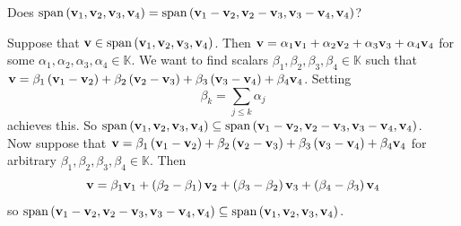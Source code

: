 \begin{exercise}
    Does \( \mathrm{span} \left( \vb{v}_{1}, \vb{v}_{2}, \vb{v}_{3}, \vb{v}_{4} \right) = \mathrm{span} \left( \vb{v}_{1} - \vb{v}_{2}, \vb{v}_{2}- \vb{v}_{3}, \vb{v}_{3}- \vb{v}_{4}, \vb{v}_{4} \right) \)?
\end{exercise}
\begin{solution}
    Suppose that \( \vb{v} \in \mathrm{span} \left( \vb{v}_{1}, \vb{v}_{2}, \vb{v}_{3}, \vb{v}_{4} \right) \). Then \( \vb{v}= \alpha_{1} \vb{v}_{1} + \alpha_{2} \vb{v}_{2} + \alpha_{3} \vb{v}_{3} + \alpha_{4} \vb{v}_{4} \) for some \( \alpha_{1}, \alpha_{2}, \alpha_{3}, \alpha_{4} \in \mathbb{K} \). We want to find scalars \( \beta_{1} , \beta_{2}, \beta_{3}, \beta_{4} \in \mathbb{K}\) such that \( \vb{v} = \beta_{1} \left( \vb{v}_{1} - \vb{v}_{2} \right) + \beta_{2} \left( \vb{v}_{2} - \vb{v}_{3} \right) + \beta_{3} \left( \vb{v}_{3} - \vb{v}_{4} \right) + \beta_{4} \vb{v}_{4}\). Setting 
    \[ \beta_{k} = \sum_{j \le k} \alpha_{j} \]
    achieves this. So \( \mathrm{span} \left( \vb{v}_{1}, \vb{v}_{2}, \vb{v}_{3}, \vb{v}_{4} \right) \subseteq \mathrm{span} \left( \vb{v}_{1} - \vb{v}_{2}, \vb{v}_{2}- \vb{v}_{3}, \vb{v}_{3}- \vb{v}_{4}, \vb{v}_{4} \right)  \). \\ 
    Now suppose that \( \vb{v} = \beta_{1} \left( \vb{v}_{1} - \vb{v}_{2} \right) + \beta_{2} \left( \vb{v}_{2} - \vb{v}_{3} \right) + \beta_{3} \left( \vb{v}_{3} - \vb{v}_{4} \right) + \beta_{4} \vb{v}_{4} \) for arbitrary \( \beta_{1} , \beta_{2}, \beta_{3}, \beta_{4} \in \mathbb{K}\). Then 
    \[ \vb{v} = \beta_{1} \vb{v}_{1} + \left( \beta_{2} - \beta_{1}\right) \vb{v}_{2} + \left( \beta_{3} - \beta_{2} \right) \vb{v}_{3} + \left( \beta_{4} - \beta_{3} \right)\vb{v}_{4}\]
    so \( \mathrm{span} \left( \vb{v}_{1} - \vb{v}_{2}, \vb{v}_{2}- \vb{v}_{3}, \vb{v}_{3}- \vb{v}_{4}, \vb{v}_{4} \right) \subseteq  \mathrm{span} \left( \vb{v}_{1}, \vb{v}_{2}, \vb{v}_{3}, \vb{v}_{4} \right) \).
\end{solution}

